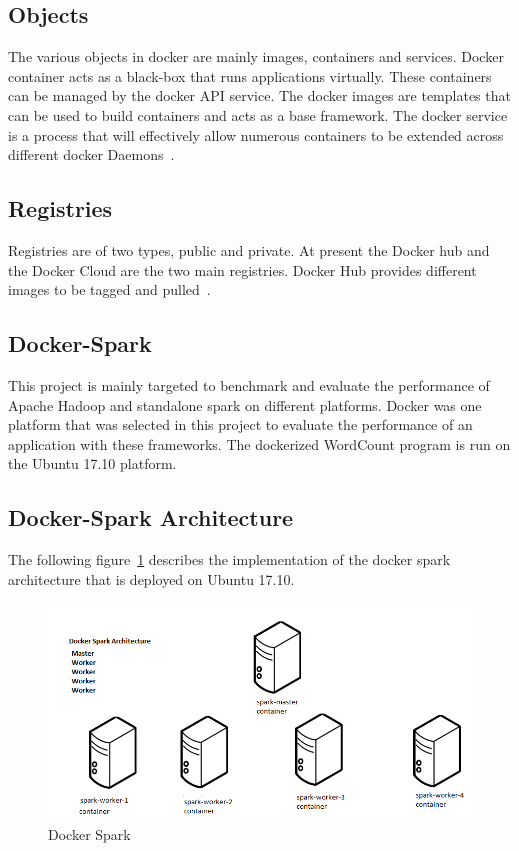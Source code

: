 \subsection{Objects}
The various objects in docker are mainly images,
 containers and services. 
Docker container acts as a black-box that runs 
applications virtually. These containers can be managed by 
the docker API service. The docker images are templates 
that can be used to build containers and acts as a base
 framework. The docker service is a process
 that will effectively allow numerous containers to be
 extended across
different docker Daemons~\cite{hid-sp18-412-docker_wikepedia}. 

\subsection{Registries}
Registries are of two types, public and private. 
At present the Docker hub and the Docker Cloud are 
the two main registries. Docker 
Hub provides different images to be tagged  
and pulled~\cite{hid-sp18-412-docker_wikepedia}.

\subsection{Docker-Spark}
This project is mainly targeted to benchmark and evaluate 
the performance of Apache Hadoop and standalone 
spark on different platforms. Docker was one
platform that was selected in this project to 
evaluate the performance of an application with these frameworks.
The dockerized WordCount program is run on the Ubuntu 17.10 platform. 

\subsection{Docker-Spark Architecture} 
The following figure~\ref{s:archidocker} describes the implementation of 
the docker spark architecture that is deployed on Ubuntu 17.10.

\begin{figure}[!ht]
\centering\includegraphics[width=\textwidth]{images/dockerspark.png}
\caption{Docker Spark}\label{sa:archidocker}\label{s:archidocker}
\end{figure}





